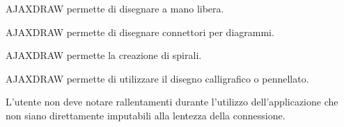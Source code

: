 \begin{elenconumerato}{\subsubsecindent}
\item{AJAXDRAW permette di disegnare a mano libera.}

\item{AJAXDRAW permette di disegnare connettori per diagrammi.}
\end{elenconumerato}

\begin{elenconumerato}{\subsubsecindent}
\item{AJAXDRAW permette la creazione di spirali.}
\item{AJAXDRAW permette di utilizzare il disegno calligrafico o pennellato.}
\end{elenconumerato}

\begin{elenconumerato}{\subsubsecindent}
\item L'utente non deve notare rallentamenti durante l'utilizzo dell'applicazione che non siano direttamente imputabili alla lentezza della connessione.
\end{elenconumerato}

